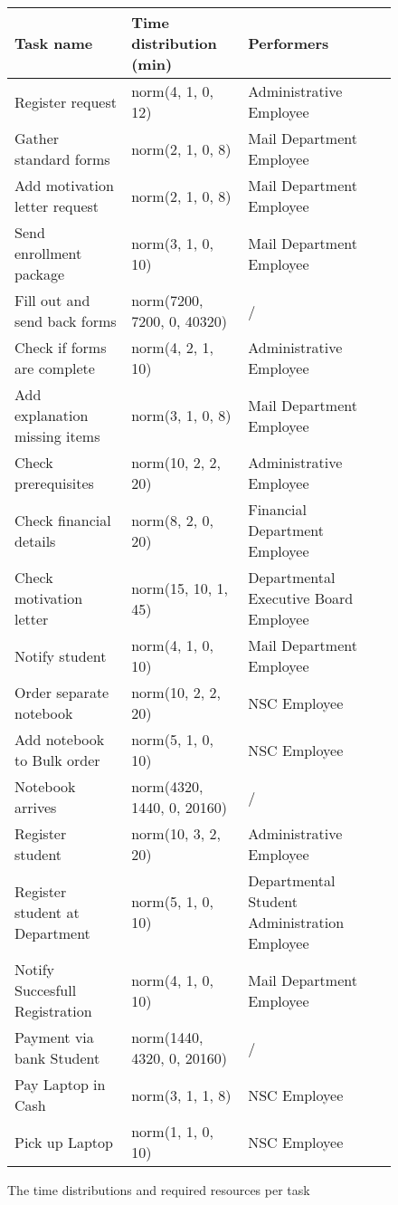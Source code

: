 \begin{figure}[h!]
	\centering
	\begin{tabularx}{\textwidth}{ | X | X | X | }
		\hline
		\textbf{Task name} & \textbf{Time distribution (min)} & \textbf{Performers}\\ \hline\hline
		Register request & norm(4, 1, 0, 12) & Administrative Employee \\ \hline
		Gather standard forms & norm(2, 1, 0, 8) & Mail Department Employee \\ \hline
		Add motivation letter request & norm(2, 1, 0, 8) & Mail Department Employee \\ \hline
		Send enrollment package & norm(3, 1, 0, 10) & Mail Department Employee \\ \hline
		Fill out and send back forms & norm(7200, 7200, 0, 40320) & / \\ \hline
		Check if forms are complete & norm(4, 2, 1, 10) & Administrative Employee \\ \hline
		Add explanation missing items & norm(3, 1, 0, 8) & Mail Department Employee \\ \hline	
		Check prerequisites & norm(10, 2, 2, 20) & Administrative Employee \\ \hline
		Check financial details & norm(8, 2, 0, 20) & Financial Department Employee \\ \hline
		Check motivation letter & norm(15, 10, 1, 45) & Departmental Executive Board Employee \\ \hline
		Notify student & norm(4, 1, 0, 10) & Mail Department Employee \\ \hline
		Order separate notebook & norm(10, 2, 2, 20) & NSC Employee \\ \hline
		Add notebook to Bulk order & norm(5, 1, 0, 10) & NSC Employee \\ \hline
		Notebook arrives & norm(4320, 1440, 0, 20160) & / \\ \hline
		Register student & norm(10, 3, 2, 20) & 
		Administrative Employee \\ \hline
		Register student at Department & norm(5, 1, 0, 10) & Departmental Student Administration Employee \\ \hline
		Notify Succesfull Registration & norm(4, 1, 0, 10) & Mail Department Employee \\ \hline
		Payment via bank Student & norm(1440, 4320, 0, 20160) & / \\ \hline
		Pay Laptop in Cash & norm(3, 1, 1, 8) & NSC Employee \\ \hline
		Pick up Laptop & norm(1, 1, 0, 10) & NSC Employee \\
		\hline
	\end{tabularx}
	\caption{The time distributions and required resources per task}
	\label{fig:tasktimes1}
\end{figure}
	
